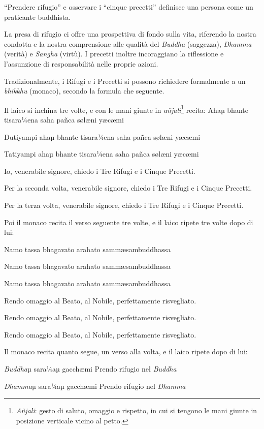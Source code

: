 

``Prendere rifugio'' e osservare i ``cinque precetti” definisce una persona
come un praticante buddhista.

La presa di rifugio ci offre una prospettiva di fondo sulla vita,
riferendo la nostra condotta e la nostra comprensione alle qualità del
\textit{Buddha} (saggezza), \textit{Dhamma} (verità) e \textit{Sangha} (virtù). I precetti inoltre
incoraggiano la riflessione e l'assunzione di responsabilità nelle
proprie azioni.

Tradizionalmente, i Rifugi e i Precetti si possono richiedere
formalmente a un \textit{bhikkhu} (monaco), secondo la formula che seguente.

Il laico si inchina tre volte, e con le mani giunte in
\textit{añjali}\footnote{\textit{Añjali}: gesto di saluto, omaggio e rispetto, in cui si
tengono le mani giunte in posizione verticale vicino al petto.} recita:
Ahaµ bhante tisara¼ena saha pañca sølæni yæcæmi

Dutiyampi ahaµ bhante tisara¼ena saha pañca sølæni yæcæmi

Tatiyampi ahaµ bhante tisara¼ena saha pañca sølæni yæcæmi

Io, venerabile signore, chiedo i Tre Rifugi e i Cinque Precetti.

Per la seconda volta, venerabile signore, chiedo i Tre Rifugi e i Cinque
Precetti.

Per la terza volta, venerabile signore, chiedo i Tre Rifugi e i Cinque
Precetti.

Poi il monaco recita il verso seguente tre volte, e il laico ripete tre
volte dopo di lui:

Namo tassa bhagavato arahato sammæsambuddhassa

Namo tassa bhagavato arahato sammæsambuddhassa

Namo tassa bhagavato arahato sammæsambuddhassa

Rendo omaggio al Beato, al Nobile, perfettamente risvegliato.

Rendo omaggio al Beato, al Nobile, perfettamente risvegliato.

Rendo omaggio al Beato, al Nobile, perfettamente risvegliato.

Il monaco recita quanto segue, un verso alla volta, e il laico ripete
dopo di lui:

\textit{Buddha}µ sara¼aµ gacchæmi Prendo rifugio nel \textit{Buddha}

\textit{Dhamma}µ sara¼aµ gacchæmi Prendo rifugio nel \textit{Dhamma}

